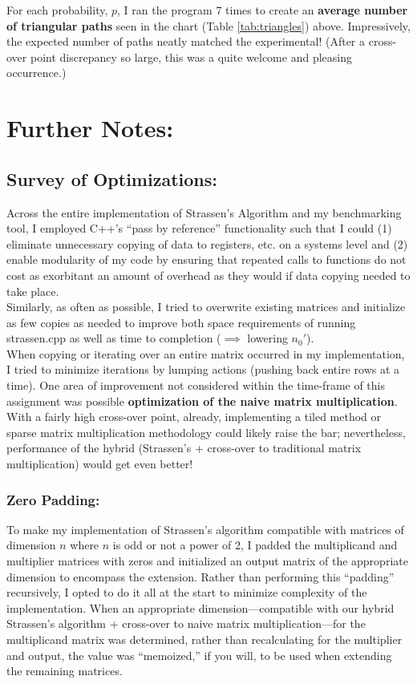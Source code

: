 \documentclass[conference]{styles/acmsiggraph}
\newcommand{\?}{\stackrel{?}{=}}
\begin{document}
For each probability, $p$, I ran the program 7 times to create an \textbf{average number of triangular paths} seen in the chart (Table \ref{tab:triangles}) above.  Impressively, the expected number of paths neatly matched the experimental!  (After a cross-over point discrepancy so large, this was a quite welcome and pleasing occurrence.)

\section{Further Notes:} \label{section:Discussion}
\subsection{Survey of Optimizations:}
Across the entire implementation of Strassen's Algorithm and my benchmarking tool, I employed C++'s \enquote{pass by reference} functionality such that I could (1) eliminate unnecessary copying of data to registers, etc. on a systems level and (2) enable modularity of my code by ensuring that repeated calls to functions do not cost as exorbitant an amount of overhead as they would if data copying needed to take place. \\

Similarly, as often as possible, I tried to overwrite existing matrices and initialize as few copies as needed to improve both space requirements of running strassen.cpp as well as time to completion ($\implies$ lowering $n_0'$). \\

When copying or iterating over an entire matrix occurred in my implementation, I tried to minimize iterations by lumping actions (pushing back entire rows at a time).  One area of improvement not considered within the time-frame of this assignment was possible \textbf{optimization of the naive matrix multiplication}.  With a fairly high cross-over point, already, implementing a tiled method or sparse matrix multiplication methodology could likely raise the bar; nevertheless, performance of the hybrid (Strassen's + cross-over to traditional matrix multiplication) would get even better!

\subsubsection{Zero Padding:}
To make my implementation of Strassen's algorithm compatible with matrices of dimension $n$ where $n$ is odd or not a power of 2, I padded the multiplicand and multiplier matrices with zeros and initialized an output matrix of the appropriate dimension to encompass the extension.  Rather than performing this \enquote{padding} recursively, I opted to do it all at the start to minimize complexity of the implementation.  When an appropriate dimension---compatible with our hybrid Strassen's algorithm + cross-over to naive matrix multiplication---for the multiplicand matrix was determined, rather than recalculating for the multiplier and output, the value was \enquote{memoized,} if you will, to be used when extending the remaining matrices. \\ 
\end{document}
